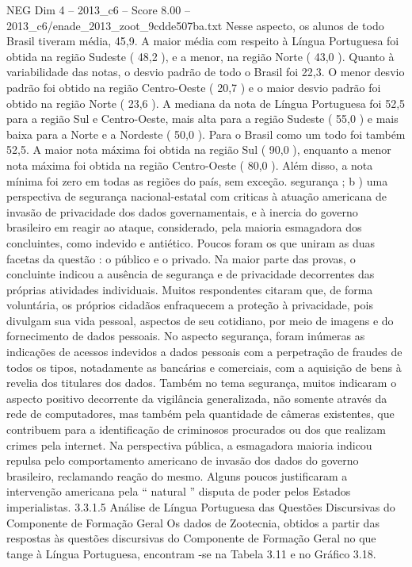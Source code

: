 \begin{textsample}{NEG Dim 4 – 2013\_c6 – Score 8.00 – 2013\_c6/enade\_2013\_zoot\_9cdde507ba.txt}
Nesse aspecto, os alunos de todo Brasil tiveram média, 45,9.
A maior média com respeito à Língua Portuguesa foi obtida na região Sudeste ( 48,2 ), e a menor, na região Norte ( 43,0 ).
Quanto à variabilidade das notas, o desvio padrão de todo o Brasil foi 22,3.
O menor desvio padrão foi obtido na região Centro-Oeste ( 20,7 ) e o maior desvio padrão foi obtido na região Norte ( 23,6 ).
A mediana da nota de Língua Portuguesa foi 52,5 para a região Sul e Centro-Oeste, mais alta para a região Sudeste ( 55,0 ) e mais baixa para a Norte e a Nordeste ( 50,0 ).
Para o Brasil como um todo foi também 52,5.
A maior nota máxima foi obtida na região Sul ( 90,0 ), enquanto a menor nota máxima foi obtida na região Centro-Oeste ( 80,0 ).
Além disso, a nota mínima foi zero em todas as regiões do país, sem exceção. segurança ; b ) uma perspectiva de segurança nacional-estatal com criticas à atuação americana de invasão de privacidade dos dados governamentais, e à inercia do governo brasileiro em reagir ao ataque, considerado, pela maioria esmagadora dos concluintes, como indevido e antiético.
Poucos foram os que uniram as duas facetas da questão : o público e o privado.
Na maior parte das provas, o concluinte indicou a ausência de segurança e de privacidade decorrentes das próprias atividades individuais.
Muitos respondentes citaram que, de forma voluntária, os próprios cidadãos enfraquecem a proteção à privacidade, pois divulgam sua vida pessoal, aspectos de seu cotidiano, por meio de imagens e do fornecimento de dados pessoais.
No aspecto segurança, foram inúmeras as indicações de acessos indevidos a dados pessoais com a perpetração de fraudes de todos os tipos, notadamente as bancárias e comerciais, com a aquisição de bens à revelia dos titulares dos dados.
Também no tema segurança, muitos indicaram o aspecto positivo decorrente da vigilância generalizada, não somente através da rede de computadores, mas também pela quantidade de câmeras existentes, que contribuem para a identificação de criminosos procurados ou dos que realizam crimes pela internet.
Na perspectiva pública, a esmagadora maioria indicou repulsa pelo comportamento americano de invasão dos dados do governo brasileiro, reclamando reação do mesmo.
Alguns poucos justificaram a intervenção americana pela “ natural ” disputa de poder pelos Estados imperialistas. 3.3.1.5 Análise de Língua Portuguesa das Questões Discursivas do Componente de Formação Geral Os dados de Zootecnia, obtidos a partir das respostas às questões discursivas do Componente de Formação Geral no que tange à Língua Portuguesa, encontram -se na Tabela 3.11 e no Gráfico 3.18.

\end{textsample}
